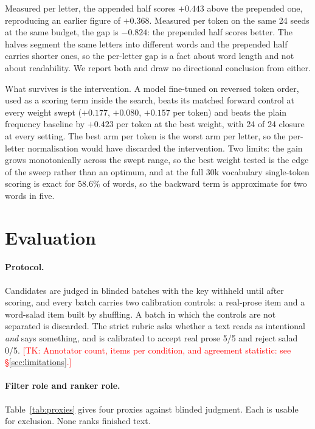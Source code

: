 \documentclass[11pt]{article}
\newif\ifprovenance\provenancetrue
\newcommand{\tk}[1]{\ifprovenance\textcolor{red}{[TK: #1]}\else#1\fi}
\begin{document}
Measured per letter, the appended half scores $+0.443$ above the prepended one,
reproducing an earlier figure of $+0.368$. Measured per token on the same 24
seeds at the same budget, the gap is $-0.824$: the prepended half scores better.
The halves segment the same letters into different words and the prepended half
carries shorter ones, so the per-letter gap is a fact about word length and not
about readability. We report both and draw no directional conclusion from
either.

What survives is the intervention. A model fine-tuned on reversed token order,
used as a scoring term inside the search, beats its matched forward control at
every weight swept ($+0.177$, $+0.080$, $+0.157$ per token) and beats the plain
frequency baseline by $+0.423$ per token at the best weight, with 24 of 24
closure at every setting. The best arm per token is the worst arm per letter,
so the per-letter normalisation would have discarded the intervention. Two
limits: the gain grows monotonically across the swept range, so the best weight
tested is the edge of the sweep rather than an optimum, and at the full 30k
vocabulary single-token scoring is exact for 58.6\% of words, so the backward
term is approximate for two words in five.

\section{Evaluation}
\label{sec:eval}

\paragraph{Protocol.}
Candidates are judged in blinded batches with the key withheld until after
scoring, and every batch carries two calibration controls: a real-prose item
and a word-salad item built by shuffling. A batch in which the controls are not
separated is discarded. The strict rubric asks whether a text reads as
intentional \emph{and} says something, and is calibrated to accept real prose
5/5 and reject salad 0/5. \tk{Annotator count, items per condition, and
agreement statistic: see \S\ref{sec:limitations}.}

\paragraph{Filter role and ranker role.}
Table~\ref{tab:proxies} gives four proxies against blinded judgment. Each is
usable for exclusion. None ranks finished text.
\end{document}
